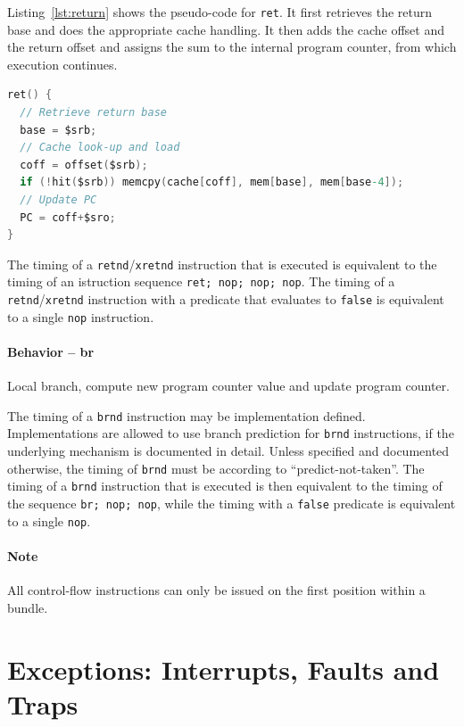 \documentclass[a4paper,fontsize=10pt,twoside,DIV15,BCOR12mm,headinclude=true,footinclude=false,pagesize,bibtotoc]{scrbook}
\begin{document}
Listing~\ref{lst:return} shows the pseudo-code for \texttt{ret}. It
first retrieves the return base and does the appropriate cache
handling. It then adds the cache offset and the return offset and
assigns the sum to the internal program counter, from which execution
continues.

\begin{lstlisting}[language=C,float=h,caption={Return\label{lst:return}}]
ret() {
  // Retrieve return base
  base = $srb;
  // Cache look-up and load
  coff = offset($srb);
  if (!hit($srb)) memcpy(cache[coff], mem[base], mem[base-4]);
  // Update PC
  PC = coff+$sro;
}
\end{lstlisting}

The timing of a \texttt{retnd}/\texttt{xretnd} instruction that is
executed is equivalent to the timing of an istruction sequence
\texttt{ret; nop; nop; nop}. The timing of a
\texttt{retnd}/\texttt{xretnd} instruction with a predicate that
evaluates to \texttt{false} is equivalent to a single \texttt{nop}
instruction.

\paragraph{Behavior -- br}

Local branch, compute new program counter value and update program
counter.

The timing of a \texttt{brnd} instruction may be implementation
defined. Implementations are allowed to use branch prediction for
\texttt{brnd} instructions, if the underlying mechanism is documented
in detail. Unless specified and documented otherwise, the timing of
\texttt{brnd} must be according to ``predict-not-taken''. The timing
of a \texttt{brnd} instruction that is executed is then equivalent to
the timing of the sequence \texttt{br; nop; nop}, while the timing
with a \texttt{false} predicate is equivalent to a single
\texttt{nop}.

\paragraph{Note}

All control-flow instructions can only be issued on the first position
within a bundle.


\clearpage
\section{Exceptions: Interrupts, Faults and Traps}
\label{sec:exc}
\end{document}
